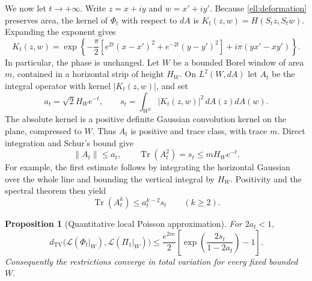 \documentclass[11pt,a4paper]{article}
\newtheorem{proposition}[theorem]{Proposition}
\theoremstyle{definition}
\theoremstyle{remark}
\numberwithin{equation}{section}
\begin{document}
We now let $t\to+\infty$.  Write $z=x+iy$ and $w=x'+iy'$.
Because \eqref{ell:deformation} preserves area, the kernel of
$\Phi_t$ with respect to $dA$ is $K_t(z,w)=H(S_tz,S_tw)$.
Expanding the exponent gives
\begin{equation}\label{ell:anisotropic-kernel}
 K_t(z,w)=\exp\left\{
 -\frac\pi2\left[e^{2t}(x-x')^2+e^{-2t}(y-y')^2\right]
 +i\pi(yx'-xy')\right\}.
\end{equation}
In particular, the phase is unchanged.  Let $W$ be a bounded Borel
window of area $m$, contained in a horizontal strip of height $H_W$.
On $L^2(W,dA)$ let $A_t$ be the integral operator with kernel
$|K_t(z,w)|$, and set
\begin{equation}\label{ell:at-st}
 a_t=\sqrt2 H_W e^{-t},\qquad
 s_t=\int_{W^2}|K_t(z,w)|^2\,dA(z)dA(w).
\end{equation}
The absolute kernel is a positive definite Gaussian convolution
kernel on the plane, compressed to $W$.  Thus $A_t$ is positive
and trace class, with trace $m$.  Direct integration and Schur's
bound give
\begin{equation}\label{ell:operator-bounds}
 \|A_t\|\le a_t,\qquad
 \operatorname{Tr}(A_t^2)=s_t\le mH_W e^{-t}.
\end{equation}
For example, the first estimate follows by integrating the
horizontal Gaussian over the whole line and bounding the vertical
integral by $H_W$.  Positivity and the spectral theorem then yield
\begin{equation}\label{ell:cycle-trace}
 \operatorname{Tr}(A_t^k)\le a_t^{k-2}s_t\qquad(k\ge2).
\end{equation}

\begin{proposition}[Quantitative local Poisson approximation]
\label{ell:tv}
For $2a_t<1$,
\begin{equation}\label{ell:tv-bound}
 d_{\mathrm{TV}}\bigl(\mathcal L(\Phi_t|_W),
                    \mathcal L(\Pi_1|_W)\bigr)
 \le\frac{e^{2m}}2
  \left[\exp\left(\frac{2s_t}{1-2a_t}\right)-1\right].
\end{equation}
Consequently the restrictions converge in total variation for
every fixed bounded $W$.
\end{proposition}
\end{document}
